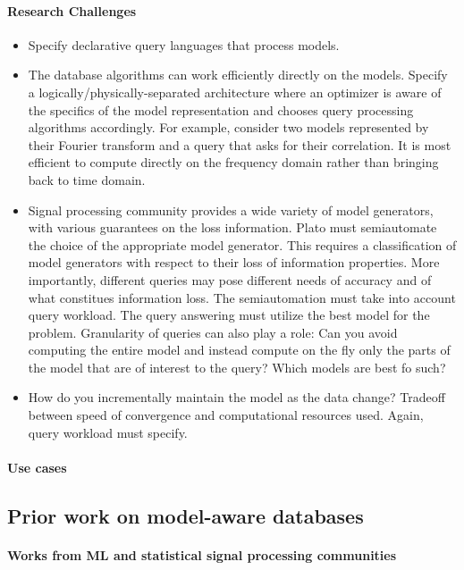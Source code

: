 \paragraph{Research Challenges}
\begin{itemize}
%
\item Specify declarative query languages that process models.
%
\item The database algorithms can work efficiently directly on the models. Specify a logically/physically-separated architecture where an optimizer is aware of the specifics of the model representation and chooses query processing algorithms accordingly.  For example, consider two models represented by their Fourier transform and a query that asks for their correlation. It is most efficient to compute directly on the frequency domain rather than bringing back to time domain.
%
\item Signal processing community provides a wide variety of model generators, with various guarantees on the loss information. Plato must semiautomate the choice of the appropriate model generator. This requires a classification of model generators with respect to their loss of information properties. More importantly, different queries may pose different needs of accuracy and of what constitues information loss. The semiautomation must take into account query workload. The query answering must utilize the best model for the problem. Granularity of queries can also play a role: Can you avoid computing the entire model and instead compute on the fly only the parts of the model that are of interest to the query? Which models are best fo such?
%
\item How do you incrementally maintain the model as the data change? Tradeoff between speed of convergence and computational resources used. Again, query workload must specify.
\end{itemize}

\paragraph{Use cases}

\subsection{Prior work on model-aware databases}

\paragraph{Works from ML and statistical signal processing communities} 

